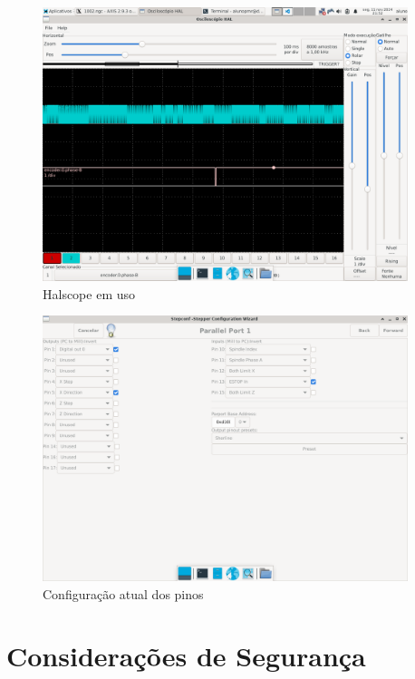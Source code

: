 \documentclass[twoside,a4paper]{refart}
\begin{document}
\begin{figure}[H]
    \begin{center}
        \includegraphics[width=0.95\textwidth]{imagens/halscope.png}
    \end{center}
    \caption{Halscope em uso}\label{halscope}
\end{figure}

\begin{figure}[H]
    \begin{center}
        \includegraphics[width=0.95\textwidth]{imagens/stepconf_config.png}
    \end{center}
    \caption{Configuração atual dos pinos}\label{stepconfig}
\end{figure}

\section{Considerações de Segurança}
\end{document}
